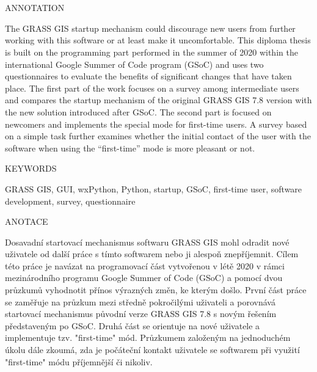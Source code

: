 \documentclass[a4paper,10pt,twoside]{article}
\begin{document}

\newpage ~ \newpage
\thispagestyle{empty}

\begin{figure}
 \centering 
 
\end{figure}


\newpage ~ \newpage
\newpage ~ \newpage
\thispagestyle{empty}


\renewcommand{\baselinestretch}{1.2} %


\begin{Large}
\noindent ANNOTATION
\end{Large}

\large
\noindent
The GRASS GIS startup mechanism could discourage new users from further 
working with this software or at least make it
uncomfortable. This diploma thesis is built on the programming part
performed in the summer of 2020 within the international Google Summer
of Code program (GSoC) and uses two questionnaires to evaluate the
benefits of significant changes that have taken place. The first part
of the work focuses on a survey among intermediate users and compares
the startup mechanism of the original GRASS GIS 7.8 version with the
new solution introduced after GSoC.  The second part is focused on 
newcomers and implements the special mode for first-time users. 
A survey based on a simple task further examines whether the initial 
contact of the user with the software when using the ``first-time'' mode
is more pleasant or not.

\vspace{2ex}
\begin{Large}
\noindent KEYWORDS
\end{Large}

\large
\noindent
\textrm{GRASS GIS, GUI, wxPython, Python, startup, GSoC, first-time user, software development, survey, questionnaire}

\mbox{}
\vfill

\begin{Large}
\noindent ANOTACE
\end{Large} 

\large
\noindent
Dosavadní startovací mechanismus softwaru GRASS GIS mohl odradit nové
uživatele od další práce s tímto softwarem nebo ji alespoň
znepříjemnit. Cílem této práce je navázat na programovací část
vytvořenou v létě 2020 v rámci mezinárodního programu Google Summer of
Code (GSoC) a pomocí dvou průzkumů vyhodnotit přínos výrazných změn,
ke kterým došlo. První část práce se zaměřuje na průzkum mezi středně
pokročilými uživateli a porovnává startovací mechanismus původní verze
GRASS GIS 7.8 s novým řešením představeným po GSoC. Druhá část 
se orientuje na nové uživatele a implementuje tzv. "first-time" mód. 
Průzkumem založeným na jednoduchém úkolu dále zkoumá, zda je počáteční 
kontakt uživatele se softwarem při využití "first-time" módu příjemnější či 
nikoliv.
\end{document}
